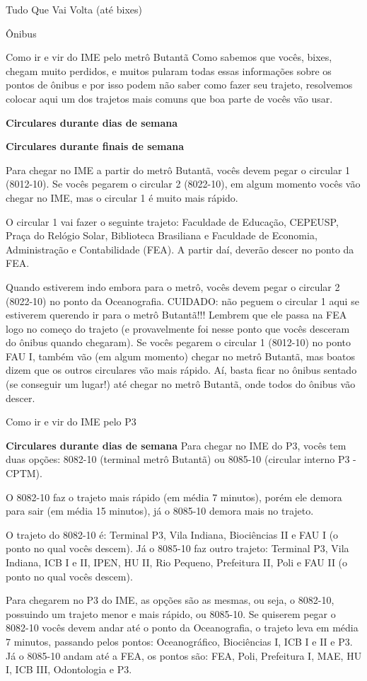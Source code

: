 \begin{secao}{Tudo Que Vai Volta (até bixes)}
\begin{subsecao}{Ônibus}
\begin{subsubsecao}{Como ir e vir do IME pelo metrô Butantã}
Como sabemos que vocês, bixes, chegam muito perdidos, e muitos pularam todas
essas informações sobre os pontos de ônibus e por isso podem não saber como
fazer seu trajeto, resolvemos colocar aqui um dos trajetos mais comuns que boa
parte de vocês vão usar.

{\bf Circulares durante dias de semana}

{\bf Circulares durante finais de semana}

Para chegar no IME a partir do metrô Butantã, vocês devem pegar o circular 1
(8012-10). Se vocês pegarem o circular 2 (8022-10), em algum momento vocês 
vão chegar no IME, mas o circular 1 é muito mais rápido.

O circular 1 vai fazer o seguinte trajeto: Faculdade de Educação, CEPEUSP,
Praça do Relógio Solar, Biblioteca Brasiliana e Faculdade de Economia,
Administração e Contabilidade (FEA). A partir daí, deverão descer no ponto da
FEA.

Quando estiverem indo embora para o metrô, vocês devem pegar o circular 2
(8022-10) no ponto da Oceanografia. CUIDADO: não peguem o circular 1 aqui
se estiverem querendo ir para o metrô Butantã!!! Lembrem que ele passa na
FEA logo no começo do trajeto (e provavelmente foi nesse ponto que vocês
desceram do ônibus quando chegaram). Se vocês pegarem o circular 1 (8012-10)
no ponto FAU I, também vão (em algum momento) chegar no metrô Butantã, mas
boatos dizem que os outros circulares vão mais rápido. Aí, basta ficar no
ônibus sentado (se conseguir um lugar!) até chegar no metrô Butantã, onde 
todos do ônibus vão descer.

\end{subsubsecao}

\begin{subsubsecao}{Como ir e vir do IME pelo P3}

{\bf Circulares durante dias de semana}
Para chegar no IME do P3, vocês tem duas opções: 8082-10 (terminal metrô 
Butantã) ou 8085-10 (circular interno P3 - CPTM). 

O 8082-10 faz o trajeto mais rápido (em média 7 minutos), porém ele demora para sair 
(em média 15 minutos), já o 8085-10 demora mais no trajeto.

O trajeto do 8082-10 é: Terminal P3, Vila Indiana, Biociências II e FAU I
(o ponto no qual vocês descem). Já o 8085-10 faz outro trajeto: Terminal P3,
Vila Indiana, ICB I e II, IPEN, HU II, Rio Pequeno, Prefeitura II, Poli e FAU II
(o ponto no qual vocês descem).

Para chegarem no P3 do IME, as opções são as mesmas, ou seja, o 8082-10, possuindo 
um trajeto menor e mais rápido, ou 8085-10. Se quiserem pegar o 8082-10 vocês 
devem andar até o ponto da Oceanografia, o trajeto leva em média 7 minutos, 
passando pelos pontos: Oceanográfico, Biociências I, ICB I e II e P3. 
Já o 8085-10 andam até a FEA, os pontos são: FEA, Poli, Prefeitura I, MAE, 
HU I, ICB III, Odontologia e P3.


\end{subsubsecao}
\end{subsecao}
\end{secao}
